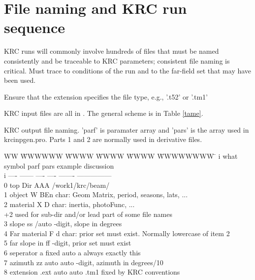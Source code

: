 \documentclass{article}
\begin{document}
\section{File naming and KRC run sequence }

 KRC runs will commonly involve hundreds of files that must be named
 consistently and be traceable to KRC parameters; consistent file naming is
 critical.  Must trace to conditions of the run and to the far-field set that
 may have been used.

Ensure that the extension specifies the file type, e.g., '.t52' or '.tm1'

KRC input files are all in  . The general scheme is in Table \ref{tame}.
 
\begin{table} \caption[File naming]{KRC output file naming. 'parf' is paramater array and 'pars' is the array used in krcinpgen.pro.  Parts 1 and 2 are normally used in derivative files.}  

\hrulefill 
\begin{tabbing} 
WW \= WWWWWW \= WWWW \= WWWW \=WWWW \= WWWWWWWW \=   \kill 
i \> what \> symbol \> parf \> pars \> example \> discussion \\
i \> ---- \> ------ \> ---- \> ---- \> ------- \> --------------- \\
0  \> top Dir \> AAA   \> /work1/krc/beam/  \>   \\
1 \> object  \> W  \>   \> BEn  char: Geom Matrix, period, seasons, lats, ...  \\
2 \> material\> X \>   \>  D  char: inertia, photoFunc, ...  \\
 \>    \>  \>  \>  \>  +2 used for sub-dir and/or lead part of some file names \\
3 \> slope   \> ss /auto \>   -digit, slope in degrees  \\
4 \> Far material \> F  \>  \> d   char: prior set must exist. Normally lowercase of item 2  \\
5 \> far slope in \> ff  \>    -digit, prior set must exist  \\
6 \> seperator  \> a \> fixed \> auto  \> a \> always exactly this  \\
7 \> azimuth    \> zz \> auto \> auto    -digit, azimuth in degrees/10  \\
8 \> extension  \> .ext \> auto  \> auto \> .tm1 \> fixed by KRC conventions  \\
\end{tabbing}
\hrulefill \end{table} 
\end{document}
